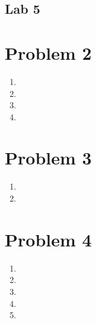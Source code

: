\documentclass[11pt, oneside]{article}   	%
\begin{document}
\begin{center}
\section*{Lab 5}
\end{center}

\begin{flushleft}



\newpage

\section*{Problem 2}

\begin{enumerate}[label=(\alph*)]
    \item %
    \item %
    \item %
    \item %
\end{enumerate}

\newpage

\section*{Problem 3}

\begin{enumerate}[label=(\alph*)]
    \item %
    \item %
\end{enumerate}

\newpage

\section*{Problem 4}

\begin{enumerate}[label=(\alph*)]
    \item %
    \item %
    \item %
    \item %
    \item %
\end{enumerate}

\end{flushleft}
\end{document}
